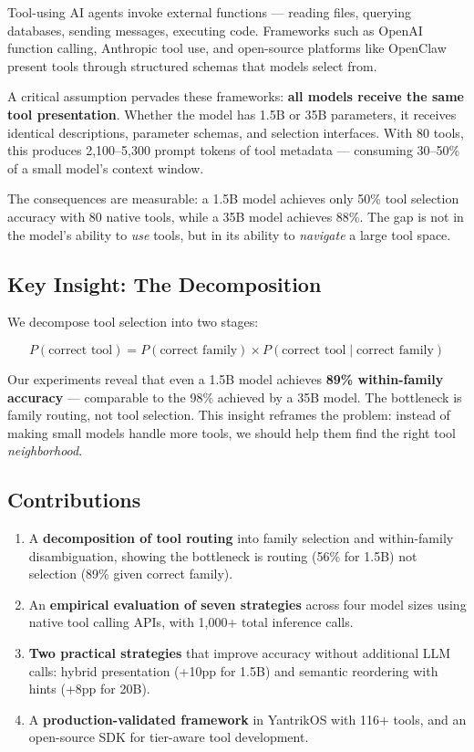 \documentclass[11pt]{article}
\begin{document}
Tool-using AI agents invoke external functions --- reading files, querying databases, sending messages, executing code. Frameworks such as OpenAI function calling, Anthropic tool use, and open-source platforms like OpenClaw present tools through structured schemas that models select from.

A critical assumption pervades these frameworks: \textbf{all models receive the same tool presentation}. Whether the model has 1.5B or 35B parameters, it receives identical descriptions, parameter schemas, and selection interfaces. With 80 tools, this produces 2,100--5,300 prompt tokens of tool metadata --- consuming 30--50\% of a small model's context window.

The consequences are measurable: a 1.5B model achieves only 50\% tool selection accuracy with 80 native tools, while a 35B model achieves 88\%. The gap is not in the model's ability to \emph{use} tools, but in its ability to \emph{navigate} a large tool space.

\subsection{Key Insight: The Decomposition}

We decompose tool selection into two stages:

\begin{equation}
P(\text{correct tool}) = P(\text{correct family}) \times P(\text{correct tool} \mid \text{correct family})
\label{eq:decomposition}
\end{equation}

Our experiments reveal that even a 1.5B model achieves \textbf{89\% within-family accuracy} --- comparable to the 98\% achieved by a 35B model. The bottleneck is family routing, not tool selection. This insight reframes the problem: instead of making small models handle more tools, we should help them find the right tool \emph{neighborhood}.

\subsection{Contributions}

\begin{enumerate}[leftmargin=*,nosep]
  \item A \textbf{decomposition of tool routing} into family selection and within-family disambiguation, showing the bottleneck is routing (56\% for 1.5B) not selection (89\% given correct family).
  \item An \textbf{empirical evaluation of seven strategies} across four model sizes using native tool calling APIs, with 1,000+ total inference calls.
  \item \textbf{Two practical strategies} that improve accuracy without additional LLM calls: hybrid presentation (+10pp for 1.5B) and semantic reordering with hints (+8pp for 20B).
  \item A \textbf{production-validated framework} in YantrikOS with 116+ tools, and an open-source SDK for tier-aware tool development.
\end{enumerate}
\end{document}
